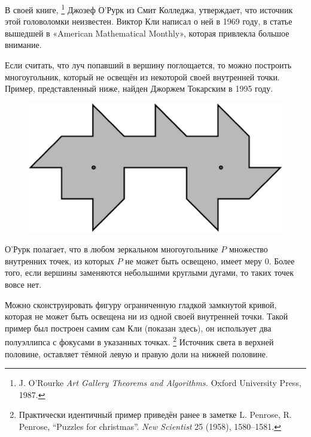 В своей книге,%
\footnote{J. O'Rourke \emph{Art Gallery Theorems and Algorithms.} Oxford University Press, 1987.}
Джозеф О’Рурк %
из Смит Колледжа, утверждает, что источник этой головоломки неизвестен.
Виктор Кли написал о ней в 1969 году, в статье вышедшей в «American Mathe\-ma\-tical Monthly», которая привлекла большое внимание. 

Если считать, что луч попавший в вершину поглощается, то можно построить многоугольник, который не освещён из некоторой своей внутренней точки.
Пример, представленный ниже, найден Джоржем Токарским в 1995 году.

\begin{figure}[h!]
\centering
\includegraphics[scale=0.5]{Figs/UnsolvedPuzzles/vision}
\end{figure} 

О’Рурк полагает, что в любом зеркальном многоугольнике $P$ множество внутренних точек, из которых $P$ не может быть освещено, имеет меру 0.
Более того, если вершины заменяются небольшими круглыми дугами, то таких точек вовсе нет.

{\sloppy

Можно сконструировать фигуру ограниченную гладкой замкнутой кривой, которая не может быть освещена ни из одной своей внутренней точки. 
Такой пример был построен самим сам Кли (показан здесь), он использует два полуэллипса с фокусами в указанных точках.%
\footnote{Практически идентичный пример приведён ранее в заметке L. Penrose, R. Penrose, ``Puzzles for christmas''. \emph{New Scientist} 25 (1958), 1580--1581.}
Источник света в верхней половине, оставляет тёмной левую и правую доли на нижней половине.

}

